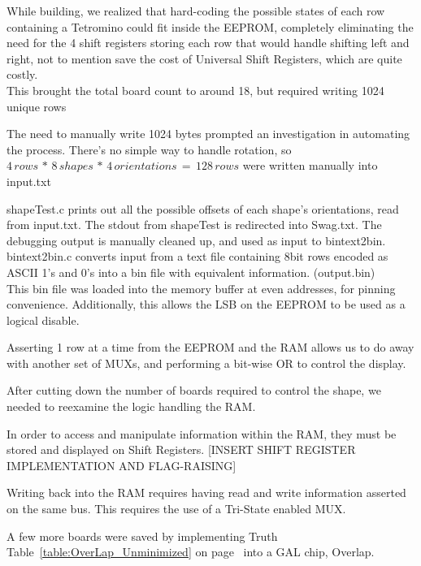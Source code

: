 \documentclass[letterpaper,titlepage,oneside]{article}
\begin{document}
While building, we realized that hard-coding the possible states of each row containing a Tetromino could fit inside the EEPROM, completely eliminating the need for the 4 shift registers storing each row that would handle shifting left and right, not to mention save the cost of Universal Shift Registers, which are quite costly. \\
This brought the total board count to around 18, but required writing 1024 unique rows

The need to manually write 1024 bytes prompted an investigation in automating the process. There's no simple way to handle rotation, so\\
$ 4 \,rows\, *\, 8\, shapes\, *\, 4 \,orientations \,=\, 128\, rows$
were written manually into input.txt

shapeTest.c prints out all the possible offsets of each shape's orientations, read from input.txt. The stdout from shapeTest is redirected into Swag.txt. The debugging output is manually cleaned up, and used as input to bintext2bin.\\
bintext2bin.c converts input from a text file containing 8bit rows encoded as ASCII 1's and 0's into a bin file with equivalent information. (output.bin)\\
This bin file was loaded into the memory buffer at even addresses, for pinning convenience. Additionally, this allows the LSB on the EEPROM to be used as a logical disable.

Asserting 1 row at a time from the EEPROM and the RAM allows us to do away with another set of MUXs, and performing a bit-wise OR to control the display.

After cutting down the number of boards required to control the shape, we needed to reexamine the logic handling the RAM.

In order to access and manipulate information within the RAM, they must be stored and displayed on Shift Registers. [INSERT SHIFT REGISTER IMPLEMENTATION AND FLAG-RAISING]

Writing back into the RAM requires having read and write information asserted on the same bus. This requires the use of a Tri-State enabled MUX.


\pagebreak
A few more boards were saved by implementing Truth Table~\ref{table:OverLap_Unminimized} on page~\pageref{table:OverLap_Unminimized}
 into a GAL chip, Overlap.
 
\end{document}
